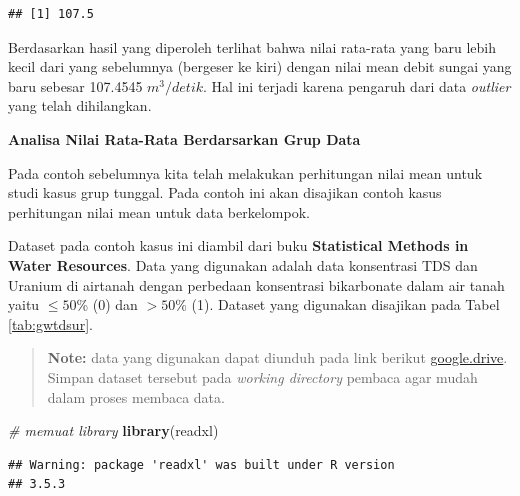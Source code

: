 \documentclass[]{book}
\newenvironment{Shaded}{\begin{snugshade}}{\end{snugshade}}
\newcommand{\KeywordTok}[1]{\textcolor[rgb]{0.13,0.29,0.53}{\textbf{#1}}}
\newcommand{\DataTypeTok}[1]{\textcolor[rgb]{0.13,0.29,0.53}{#1}}
\newcommand{\StringTok}[1]{\textcolor[rgb]{0.31,0.60,0.02}{#1}}
\newcommand{\CommentTok}[1]{\textcolor[rgb]{0.56,0.35,0.01}{\textit{#1}}}
\newcommand{\OperatorTok}[1]{\textcolor[rgb]{0.81,0.36,0.00}{\textbf{#1}}}
\newcommand{\NormalTok}[1]{#1}
\begin{document}
\begin{verbatim}
## [1] 107.5
\end{verbatim}

Berdasarkan hasil yang diperoleh terlihat bahwa nilai rata-rata yang
baru lebih kecil dari yang sebelumnya (bergeser ke kiri) dengan nilai
mean debit sungai yang baru sebesar 107.4545 \(m^3/detik\). Hal ini
terjadi karena pengaruh dari data \emph{outlier} yang telah dihilangkan.

\textbf{Analisa Nilai Rata-Rata Berdarsarkan Grup Data}

Pada contoh sebelumnya kita telah melakukan perhitungan nilai mean untuk
studi kasus grup tunggal. Pada contoh ini akan disajikan contoh kasus
perhitungan nilai mean untuk data berkelompok.

Dataset pada contoh kasus ini diambil dari buku \textbf{Statistical
Methods in Water Resources}. Data yang digunakan adalah data konsentrasi
TDS dan Uranium di airtanah dengan perbedaan konsentrasi bikarbonate
dalam air tanah yaitu \(\leq 50\)\% (0) dan \(>50\)\% (1). Dataset yang
digunakan disajikan pada Tabel \ref{tab:gwtdsur}.

\begin{quote}
\textbf{Note: } data yang digunakan dapat diunduh pada link berikut
\href{https://drive.google.com/open?id=1-k_1Fkl2hWmI9ZohG9hWGrqKe4o8GArW}{google.drive}.
Simpan dataset tersebut pada \emph{working directory} pembaca agar mudah
dalam proses membaca data.
\end{quote}

\begin{Shaded}
\begin{Highlighting}[]
\CommentTok{# memuat library}
\KeywordTok{library}\NormalTok{(readxl)}
\end{Highlighting}
\end{Shaded}

\begin{verbatim}
## Warning: package 'readxl' was built under R version
## 3.5.3
\end{verbatim}

\begin{Shaded}
\end{Shaded}
\end{document}
